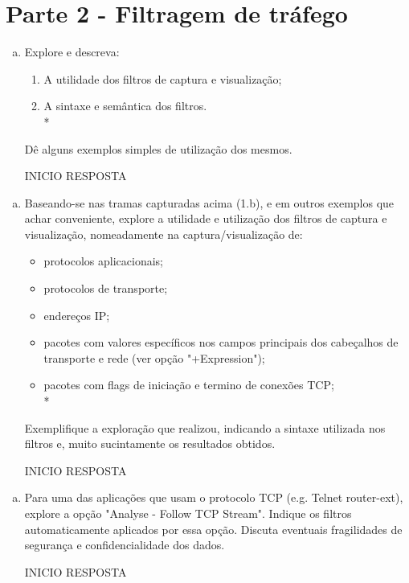 \documentclass{llncs}
\begin{document}
\section{Parte 2 - Filtragem de tráfego}

\begin{enumerate}[a)]
  \item Explore e descreva:
  \begin{enumerate}[i]
    \item A utilidade dos filtros de captura e visualização;    
    \item A sintaxe e semântica dos filtros.\\*
  \end{enumerate}
  \par Dê alguns exemplos simples de utilização dos mesmos.

  \begin{flushleft}
    INICIO RESPOSTA    
  \end{flushleft}
\end{enumerate}


\begin{enumerate}[b)]
  \item  Baseando-se nas tramas capturadas acima (1.b), e em outros exemplos que achar conveniente, explore a
  utilidade e utilização dos filtros de captura e visualização, nomeadamente na captura/visualização de:
  \begin{itemize}
    \item protocolos aplicacionais;
    \item protocolos de transporte;
    \item endereços IP;
    \item pacotes com valores específicos nos campos principais dos cabeçalhos de transporte e rede (ver opção
    "+Expression");
    \item pacotes com flags de iniciação e termino de conexões TCP;\\*
  \end{itemize}
  \par Exemplifique a exploração que realizou, indicando a sintaxe utilizada nos filtros e, muito sucintamente os
  resultados obtidos.
  \begin{flushleft}
    INICIO RESPOSTA
  \end{flushleft}
\end{enumerate}


\begin{enumerate}[c)]
  \item Para uma das aplicações que usam o protocolo TCP (e.g. Telnet router-ext), explore a opção "Analyse - Follow TCP Stream". Indique os filtros automaticamente aplicados por essa opção. Discuta eventuais fragilidades
  de segurança e confidencialidade dos dados.
  \begin{flushleft}
    INICIO RESPOSTA    
  \end{flushleft} 
\end{enumerate}
\end{document}
